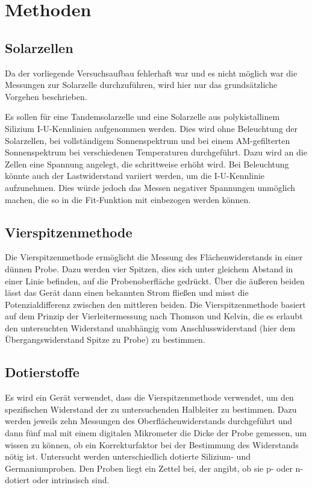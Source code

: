 \documentclass[
	a4paper,
	12pt,
	pagesize,
	ngerman
]{scrartcl}
\begin{document}

	\section{Methoden}
	\subsection{Solarzellen}
	Da der vorliegende Versuchsaufbau fehlerhaft war und es nicht möglich war die Messungen zur Solarzelle durchzuführen, wird hier nur das grundsätzliche Vorgehen beschrieben.

	Es sollen für eine Tandemsolarzelle und eine Solarzelle aus polykistallinem Silizium I-U-Kennlinien aufgenommen werden.
	Dies wird ohne Beleuchtung der Solarzellen, bei vollständigem Sonnenspektrum und bei einem AM-gefilterten Sonnenspektrum bei verschiedenen Temperaturen durchgeführt.
	Dazu wird an die Zellen eine Spannung angelegt, die schrittweise erhöht wird.
	Bei Beleuchtung könnte auch der Lastwiderstand variiert werden, um die I-U-Kennlinie aufzunehmen.
	Dies würde jedoch das Messen negativer Spannungen unmöglich machen, die so in die Fit-Funktion mit einbezogen werden können.

	\subsection{Vierspitzenmethode}
	Die Vierspitzenmethode ermöglicht die Messung des Flächenwiderstands in einer dünnen Probe.
	Dazu werden vier Spitzen, dies sich unter gleichem Abstand in einer Linie befinden, auf die Probenoberfläche gedrückt.
	Über die äußeren beiden lässt das Gerät dann einen bekannten Strom fließen und misst die Potenzialdifferenz zwischen den mittleren beiden.
	Die Vierspitzenmethode basiert auf dem Prinzip der Vierleitermessung nach Thomson und Kelvin, die es erlaubt den untersuchten Widerstand unabhängig vom Anschlusswiderstand (hier dem Übergangswiderstand Spitze zu Probe) zu bestimmen.

	\subsection{Dotierstoffe}
	Es wird ein Gerät verwendet, dass die Vierspitzenmethode verwendet, um den spezifischen Widerstand der zu untersuchenden Halbleiter zu bestimmen.
	Dazu werden jeweils zehn Messungen des Oberflächenwiderstands durchgeführt und dann fünf mal mit einem digitalen Mikrometer die Dicke der Probe gemessen, um wissen zu können, ob ein Korrekturfaktor bei der Bestimmung des Widerstands nötig ist.
	Untersucht werden unterschiedlich dotierte Silizium- und Germaniumproben.
	Den Proben liegt ein Zettel bei, der angibt, ob sie p- oder n-dotiert oder intrinsisch sind.
\end{document}
